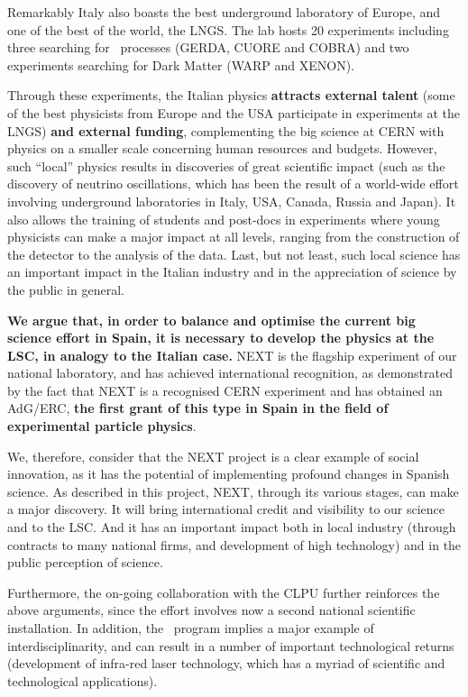 Remarkably Italy also boasts the best underground laboratory of Europe, and one of the best of the world, the LNGS. The lab hosts 20 experiments including three searching for \bbonu\ processes (GERDA, CUORE and COBRA) and two experiments searching for Dark Matter (WARP and XENON). 

Through these experiments, the Italian physics {\bf attracts external talent} (some of the best physicists from Europe and the USA participate in experiments at the LNGS) {\bf and external funding}, complementing the big science at CERN with physics on a smaller scale concerning human resources and budgets. However, such ``local'' physics results in discoveries of great scientific impact (such as the discovery of neutrino oscillations, which has been the result of a world-wide effort involving underground laboratories in Italy, USA, Canada, Russia and Japan). It also allows the training of students and post-docs in experiments where young physicists can make a major impact at all levels, ranging from the construction of the detector to the analysis of the data. Last, but not least, such local science has an important impact in the Italian industry and in the appreciation of science by the public in general. 

{\bf We argue that, in order to balance and optimise the current big science effort in Spain, it is necessary to develop the physics at the LSC, in analogy to the Italian case.} NEXT is the flagship experiment of our national laboratory, and has achieved international recognition, as demonstrated by the fact that NEXT is a recognised CERN experiment and has obtained an AdG/ERC, {\bf the first grant of this type in Spain in the field of experimental particle physics}. 

We, therefore, consider that the NEXT project is a clear example of social innovation, as it has the potential of implementing profound changes in Spanish science. As described in this project, NEXT, through its various stages, can make a major discovery. It will bring international credit and visibility to our science and to the LSC. And it has an important impact both in local industry (through contracts to many national firms, and development of high technology) and in the public perception of science. 

Furthermore, the on-going collaboration with the CLPU further reinforces the above arguments, since the effort involves now a second national scientific installation. In addition, the \BATA\ program implies a major example of interdisciplinarity, and can result in a number of important technological returns (development of infra-red laser technology, which has a myriad of scientific and technological applications).

